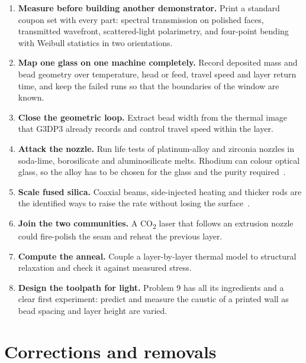 \documentclass[10pt,a4paper]{article}
\begin{document}
\begin{enumerate}
  \item \textbf{Measure before building another demonstrator.} Print a standard coupon set with every part: spectral transmission on polished faces, transmitted wavefront, scattered-light polarimetry, and four-point bending with Weibull statistics in two orientations.
  \item \textbf{Map one glass on one machine completely.} Record deposited mass and bead geometry over temperature, head or feed, travel speed and layer return time, and keep the failed runs so that the boundaries of the window are known.
  \item \textbf{Close the geometric loop.} Extract bead width from the thermal image that G3DP3 already records and control travel speed within the layer.
  \item \textbf{Attack the nozzle.} Run life tests of platinum-alloy and zirconia nozzles in soda-lime, borosilicate and aluminosilicate melts. Rhodium can colour optical glass, so the alloy has to be chosen for the glass and the purity required~\citep{heraeus_pgm,pgm2010}.
  \item \textbf{Scale fused silica.} Coaxial beams, side-injected heating and thicker rods are the identified ways to raise the rate without losing the surface~\citep{lgd2021coaxial,capps2021interface}.
  \item \textbf{Join the two communities.} A CO\textsubscript{2} laser that follows an extrusion nozzle could fire-polish the seam and reheat the previous layer.
  \item \textbf{Compute the anneal.} Couple a layer-by-layer thermal model to structural relaxation and check it against measured stress.
  \item \textbf{Design the toolpath for light.} Problem 9 has all its ingredients and a clear first experiment: predict and measure the caustic of a printed wall as bead spacing and layer height are varied.
\end{enumerate}

\section{Corrections and removals}\label{sec:removed}
\end{document}
